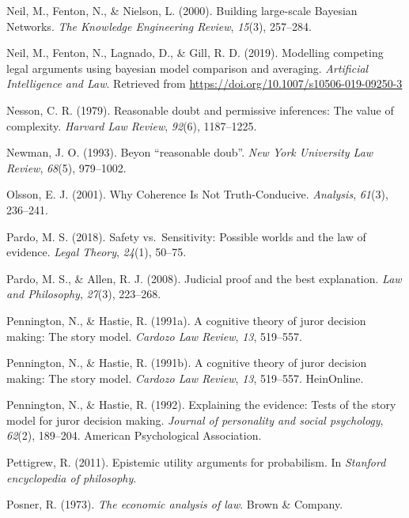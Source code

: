 \documentclass[11pt,dvipsnames,enabledeprecatedfontcommands]{scrartcl}
\begin{document}
\hypertarget{ref-neil2000BuildingLargescaleBayesian}{}
Neil, M., Fenton, N., \& Nielson, L. (2000). Building large-scale
Bayesian Networks. \emph{The Knowledge Engineering Review},
\emph{15}(3), 257--284.

\hypertarget{ref-Fenton2019Modelling}{}
Neil, M., Fenton, N., Lagnado, D., \& Gill, R. D. (2019). Modelling
competing legal arguments using bayesian model comparison and averaging.
\emph{Artificial Intelligence and Law}. Retrieved from
\url{https://doi.org/10.1007/s10506-019-09250-3}

\hypertarget{ref-Nesson1979Reasonable-doub}{}
Nesson, C. R. (1979). Reasonable doubt and permissive inferences: The
value of complexity. \emph{Harvard Law Review}, \emph{92}(6),
1187--1225.

\hypertarget{ref-newman1993}{}
Newman, J. O. (1993). Beyon ``reasonable doub''. \emph{New York
University Law Review}, \emph{68}(5), 979--1002.

\hypertarget{ref-olsson2001}{}
Olsson, E. J. (2001). Why Coherence Is Not Truth-Conducive.
\emph{Analysis}, \emph{61}(3), 236--241.

\hypertarget{ref-pardo2018}{}
Pardo, M. S. (2018). Safety vs.~Sensitivity: Possible worlds and the law
of evidence. \emph{Legal Theory}, \emph{24}(1), 50--75.

\hypertarget{ref-Pardo2008judicial}{}
Pardo, M. S., \& Allen, R. J. (2008). Judicial proof and the best
explanation. \emph{Law and Philosophy}, \emph{27}(3), 223--268.

\hypertarget{ref-Pennington1991}{}
Pennington, N., \& Hastie, R. (1991a). A cognitive theory of juror
decision making: The story model. \emph{Cardozo Law Review}, \emph{13},
519--557.

\hypertarget{ref-pennington1991cognitive}{}
Pennington, N., \& Hastie, R. (1991b). A cognitive theory of juror
decision making: The story model. \emph{Cardozo Law Review}, \emph{13},
519--557. HeinOnline.

\hypertarget{ref-pennington1992explaining}{}
Pennington, N., \& Hastie, R. (1992). Explaining the evidence: Tests of
the story model for juror decision making. \emph{Journal of personality
and social psychology}, \emph{62}(2), 189--204. American Psychological
Association.

\hypertarget{ref-Pettigrew2011Epistemic-Utili}{}
Pettigrew, R. (2011). Epistemic utility arguments for probabilism. In
\emph{Stanford encyclopedia of philosophy}.

\hypertarget{ref-Posner1973}{}
Posner, R. (1973). \emph{The economic analysis of law}. Brown \&
Company.
\end{document}
